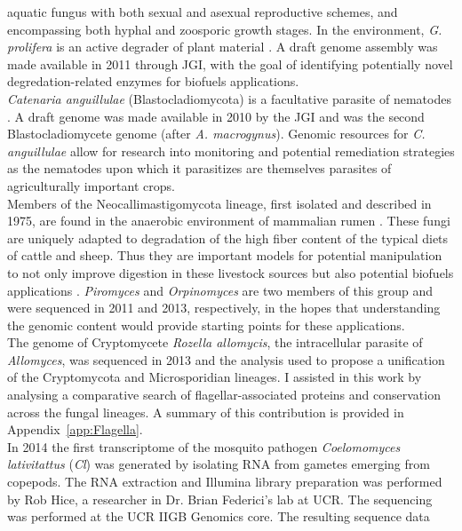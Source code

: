 aquatic fungus with both sexual and asexual reproductive schemes, and
encompassing both hyphal and zoosporic growth stages. In the
environment, \textit{G. prolifera} is an active degrader of plant
material \cite{Karling1977}. A draft genome assembly was made available in
2011 through JGI, with the goal of identifying potentially novel
degredation-related enzymes for biofuels applications. \\
\indent \textit{Catenaria anguillulae} (Blastocladiomycota) is a
facultative parasite of nematodes \cite{Deacon1997}. A draft genome
was made available in 2010 by the JGI and was the second
Blastocladiomycete genome (after \textit{A. macrogynus}). Genomic
resources for \textit{C. anguillulae} allow for research into
monitoring and potential remediation strategies as the nematodes upon
which it parasitizes are themselves parasites of agriculturally
important crops.\\
\indent Members of the Neocallimastigomycota lineage, first isolated
and described in 1975, are found in the anaerobic environment of
mammalian rumen \cite{Orpin1975}. These fungi are uniquely adapted to
degradation of the high fiber content of the typical diets of cattle
and sheep. Thus they are important models for potential manipulation
to not only improve digestion in these livestock sources \cite{Ho1995}
but also potential biofuels applications
\cite{Youssef2013,Gruninger2014}. \textit{Piromyces} and \textit{Orpinomyces} are
two members of this group and were sequenced in 2011 and 2013,
respectively, in the hopes that understanding the genomic content
would provide starting points for these applications. \\
\indent The genome of Cryptomycete \textit{Rozella allomycis}, the
intracellular parasite of \textit{Allomyces}, was sequenced in 2013
\cite{James2013} and the analysis used to propose a unification of the
Cryptomycota and Microsporidian lineages. I assisted in this work 
by analysing a comparative search of flagellar-associated proteins
and conservation across the fungal lineages. A summary of this contribution
is provided in Appendix~\ref{app:Flagella}.\\
\indent In 2014 the first transcriptome of the mosquito pathogen
\textit{Coelomomyces lativitattus} (\textit{Cl}) was generated by
isolating RNA from gametes emerging from copepods. The RNA extraction
and Illumina library preparation was performed by Rob Hice, a
researcher in Dr. Brian Federici's lab at UCR. The sequencing was
performed at the UCR IIGB Genomics core. The resulting sequence data
